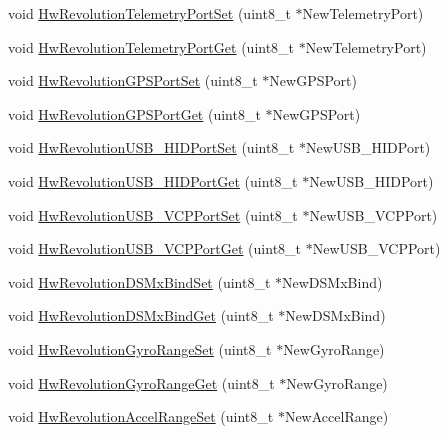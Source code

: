 \begin{DoxyCompactItemize}
void \hyperlink{group___hw_revolution_gaf1aaa4f89c9ca729495191e7473c9a24}{\-Hw\-Revolution\-Telemetry\-Port\-Set} (uint8\-\_\-t $\ast$\-New\-Telemetry\-Port)
\item 
void \hyperlink{group___hw_revolution_ga64569786d0cbc0a63ce3baaa3d443766}{\-Hw\-Revolution\-Telemetry\-Port\-Get} (uint8\-\_\-t $\ast$\-New\-Telemetry\-Port)
\item 
void \hyperlink{group___hw_revolution_gac596986ded1702f580acc6a2e908aa33}{\-Hw\-Revolution\-G\-P\-S\-Port\-Set} (uint8\-\_\-t $\ast$\-New\-G\-P\-S\-Port)
\item 
void \hyperlink{group___hw_revolution_gafdfa2e64734d2a89810f9919729d5655}{\-Hw\-Revolution\-G\-P\-S\-Port\-Get} (uint8\-\_\-t $\ast$\-New\-G\-P\-S\-Port)
\item 
void \hyperlink{group___hw_revolution_ga7c38e75fa7cd7e11724de84ad3143447}{\-Hw\-Revolution\-U\-S\-B\-\_\-\-H\-I\-D\-Port\-Set} (uint8\-\_\-t $\ast$\-New\-U\-S\-B\-\_\-\-H\-I\-D\-Port)
\item 
void \hyperlink{group___hw_revolution_ga357a48a64a449b3bdbebc222a45695b3}{\-Hw\-Revolution\-U\-S\-B\-\_\-\-H\-I\-D\-Port\-Get} (uint8\-\_\-t $\ast$\-New\-U\-S\-B\-\_\-\-H\-I\-D\-Port)
\item 
void \hyperlink{group___hw_revolution_ga7e02b77e82fc37caf15db3eec69a6411}{\-Hw\-Revolution\-U\-S\-B\-\_\-\-V\-C\-P\-Port\-Set} (uint8\-\_\-t $\ast$\-New\-U\-S\-B\-\_\-\-V\-C\-P\-Port)
\item 
void \hyperlink{group___hw_revolution_gae995e05379e1930cf41ffa3f2a76ed2a}{\-Hw\-Revolution\-U\-S\-B\-\_\-\-V\-C\-P\-Port\-Get} (uint8\-\_\-t $\ast$\-New\-U\-S\-B\-\_\-\-V\-C\-P\-Port)
\item 
void \hyperlink{group___hw_revolution_ga075e89dca967b477476d2ec7da6e6f22}{\-Hw\-Revolution\-D\-S\-Mx\-Bind\-Set} (uint8\-\_\-t $\ast$\-New\-D\-S\-Mx\-Bind)
\item 
void \hyperlink{group___hw_revolution_gadf046224bc563d52221a7de258185bbd}{\-Hw\-Revolution\-D\-S\-Mx\-Bind\-Get} (uint8\-\_\-t $\ast$\-New\-D\-S\-Mx\-Bind)
\item 
void \hyperlink{group___hw_revolution_gae6c13e49a32ad2f7db9baaafe27e7583}{\-Hw\-Revolution\-Gyro\-Range\-Set} (uint8\-\_\-t $\ast$\-New\-Gyro\-Range)
\item 
void \hyperlink{group___hw_revolution_ga34ffcfe06d823fa29d1e4b2476a8f8a0}{\-Hw\-Revolution\-Gyro\-Range\-Get} (uint8\-\_\-t $\ast$\-New\-Gyro\-Range)
\item 
void \hyperlink{group___hw_revolution_ga5553a710e2d1a0333b333ab56678fc9b}{\-Hw\-Revolution\-Accel\-Range\-Set} (uint8\-\_\-t $\ast$\-New\-Accel\-Range)

\end{DoxyCompactItemize}
